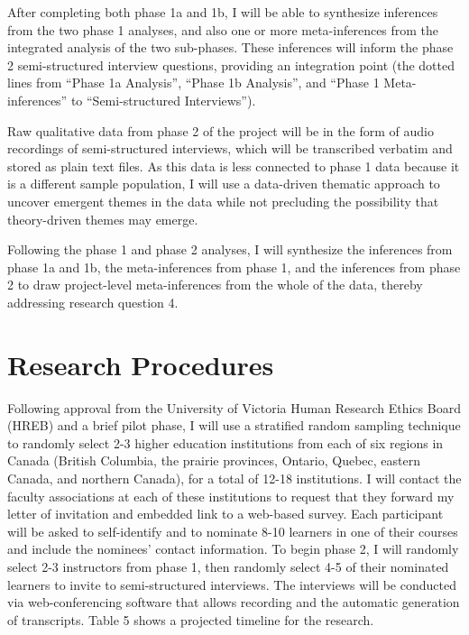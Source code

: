 \documentclass[
]{book}
\begin{document}
After completing both phase 1a and 1b, I will be able to synthesize inferences from the two phase 1 analyses, and also one or more meta-inferences from the integrated analysis of the two sub-phases. These inferences will inform the phase 2 semi-structured interview questions, providing an integration point (the dotted lines from ``Phase 1a Analysis'', ``Phase 1b Analysis'', and ``Phase 1 Meta-inferences'' to ``Semi-structured Interviews'').

Raw qualitative data from phase 2 of the project will be in the form of audio recordings of semi-structured interviews, which will be transcribed verbatim and stored as plain text files. As this data is less connected to phase 1 data because it is a different sample population, I will use a data-driven thematic approach to uncover emergent themes in the data while not precluding the possibility that theory-driven themes may emerge.

Following the phase 1 and phase 2 analyses, I will synthesize the inferences from phase 1a and 1b, the meta-inferences from phase 1, and the inferences from phase 2 to draw project-level meta-inferences from the whole of the data, thereby addressing research question 4.

\hypertarget{research-procedures}{%
\section{Research Procedures}\label{research-procedures}}

Following approval from the University of Victoria Human Research Ethics Board (HREB) and a brief pilot phase, I will use a stratified random sampling technique to randomly select 2-3 higher education institutions from each of six regions in Canada (British Columbia, the prairie provinces, Ontario, Quebec, eastern Canada, and northern Canada), for a total of 12-18 institutions. I will contact the faculty associations at each of these institutions to request that they forward my letter of invitation and embedded link to a web-based survey. Each participant will be asked to self-identify and to nominate 8-10 learners in one of their courses and include the nominees' contact information. To begin phase 2, I will randomly select 2-3 instructors from phase 1, then randomly select 4-5 of their nominated learners to invite to semi-structured interviews. The interviews will be conducted via web-conferencing software that allows recording and the automatic generation of transcripts. Table 5 shows a projected timeline for the research.
\end{document}
